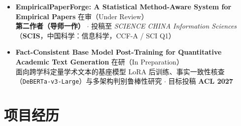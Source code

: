 \documentclass[10pt,letterpaper]{article}
\begin{document}
\begin{itemize}[leftmargin=10pt]
  \item \textbf{EmpiricalPaperForge: A Statistical Method-Aware System for Empirical Papers} \hfill 在审（Under Review） \\
  \textbf{第二作者（导师一作）} $\cdot$ 投稿至 \emph{SCIENCE CHINA Information Sciences}（\textbf{SCIS}，中国科学：信息科学，CCF-A / SCI Q1）
  \item \textbf{Fact-Consistent Base Model Post-Training for Quantitative Academic Text Generation} \hfill 在研（In Preparation） \\
  面向跨学科定量学术文本的基座模型 LoRA 后训练、事实一致性核查（\texttt{DeBERTa-v3-Large}）与多架构判别鲁棒性研究 $\cdot$ 目标投稿 \textbf{ACL 2027}
\end{itemize}

\section{项目经历}
\end{document}
